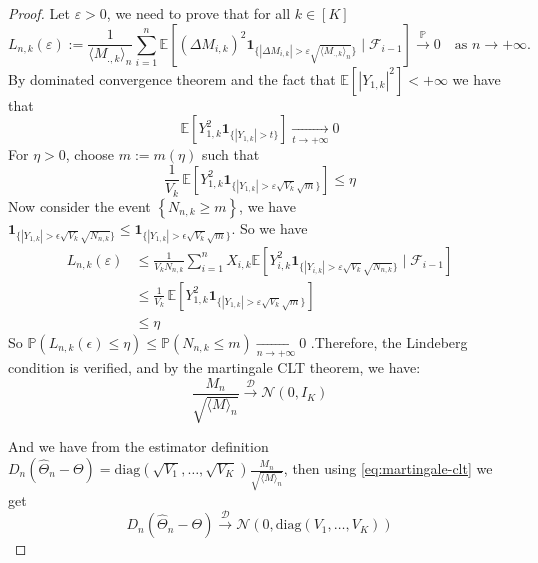 \documentclass[11pt]{article}
\theoremstyle{plain}
\theoremstyle{definition}
\begin{document}
\begin{appendix}
\begin{proof}
	Let $\varepsilon > 0$, we need to prove that for all \(k \in [K]\)
	\begin{equation*}
		L_{n,k}(\varepsilon) 
		:= \frac{1}{\langle M_{.,k} \rangle_n} 
		\sum_{i=1}^n 
		\mathbb{E}\!\left[
		(\Delta M_{i,k})^2 
		\mathbf{1}_{\{|\Delta M_{i,k}| > \varepsilon \sqrt{\langle M_{.,k} \rangle_n}\}}
		\mid \mathcal{F}_{i-1}
		\right]
		\overset{\mathbb{P}}{\longrightarrow} 0 
		\quad \text{as } n \to +\infty.
	\end{equation*}
	By dominated convergence theorem and the fact that $\mathbb{E}\!\left[ |Y_{1,k}|^{2} \right] < +\infty$ we have that 
	\[\mathbb{E}\!\left[Y_{1,k}^2  \mathbf{1}_{\{|Y_{1,k}| > t\}}
	\right] \underset{t \to +\infty}{\longrightarrow} 0\]
	For \(\eta > 0\), choose \(m := m(\eta)\) such that 
	\[
	\frac{1}{V_k}
	\, \mathbb{E}\!\left[
	Y_{1,k}^2 
	\mathbf{1}_{\{|Y_{1,k}| > \varepsilon \sqrt{V_k} \sqrt{m}\}}
	\right] \leq \eta
	\]
	Now consider the event \(\left\{N_{n,k} \geq m\right\}\), we 
	have \(\mathbf{1}_{\{|Y_{1,k}| > \epsilon \sqrt{V_k} \sqrt{N_{n,k}}\}} \leq \mathbf{1}_{\{|Y_{1,k}| > \epsilon \sqrt{V_k} \sqrt{m}\}}\). So we have 	
	\begin{align*}
		L_{n,k}(\varepsilon)
		&\le 
		\frac{1}{V_k N_{n,k}} 
		\sum_{i=1}^n 
		X_{i,k} 
		\mathbb{E}\!\left[
		Y_{i,k}^2 
		\mathbf{1}_{\{|Y_{i,k}| > \varepsilon \sqrt{V_k} \sqrt{N_{n,k}}\}}
		\mid \mathcal{F}_{i-1}
		\right] \\
		&\leq 
		\frac{1}{V_k}
		\, \mathbb{E}\!\left[
		Y_{1,k}^2 
		\mathbf{1}_{\{|Y_{1,k}| > \varepsilon \sqrt{V_k} \sqrt{m}\}}
		\right] \\
		&\leq \eta
	\end{align*}
	So \(\mathbb{P}\left(L_{n,k}(\epsilon) \leq \eta\right) \leq \mathbb{P}\left(N_{n,k} \leq m\right) \underset{n \to +\infty}{\longrightarrow} 0\)	
	.Therefore, the Lindeberg condition is verified, and by the martingale CLT theorem, we have:
	\begin{equation}\label{eq:martingale-clt}
		\frac{M_n}{\sqrt{\langle M \rangle_n}} 
		\overset{\mathcal{D}}{\longrightarrow} 
		\mathcal{N}(0,I_K)
	\end{equation}
	
	And we have from the estimator definition \(D_n\left(\hat{\Theta}_n - \Theta\right) = \mathrm{diag}\left(\sqrt{V_1}, \ldots, \sqrt{V_K}\right)\frac{M_n}{\sqrt{\langle M \rangle_n}}\), then using \eqref{eq:martingale-clt} we get
	\begin{equation*}
		D_n\left(\hat{\Theta}_n - \Theta\right)
		\overset{\mathcal{D}}{\longrightarrow} 
		\mathcal{N}\left(0,\mathrm{diag}\left(V_1, \ldots, V_K\right)\right)
	\end{equation*}
\end{proof}



\end{appendix}
\end{document}

